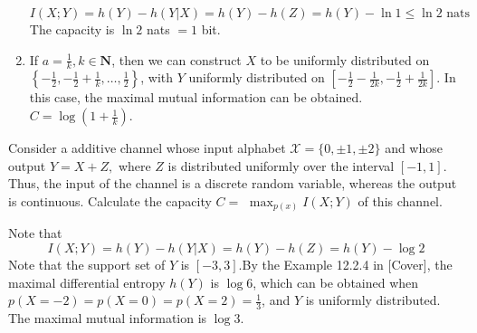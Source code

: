 \begin{exercise}
\begin{solution}
\begin{enumerate}
    \begin{equation}
      I(X;Y) = h(Y) - h(Y|X) = h(Y) - h(Z) = h(Y) - \ln 1 \le \ln 2 \text{ nats}
    \end{equation}
    The capacity is $\ln 2$ nats $= 1$ bit.
    \item If $a = \frac{1}{k}, k\in \mathbf{N}$, then we can construct $X$ to be uniformly distributed on $\left\{-\frac{1}{2}, -\frac{1}{2} + \frac{1}{k}, \ldots,\frac{1}{2} \right\}$, with $Y$ uniformly distributed on $\left[-\frac{1}{2}-\frac{1}{2k}, -\frac{1}{2}+\frac{1}{2k} \right]$. In this case, the maximal mutual information can be obtained. $C = \log \left(1+ \frac{1}{k}\right)$.
  \end{enumerate}
  \end{solution}
  \label{ex8-3}
\end{exercise}


\begin{exercise}{ Consider a additive channel whose input alphabet $\mathcal{X}=\{0,\pm 1,\pm 2\}$ and whose output $Y=X+Z,$ where $Z$ is distributed uniformly over the interval $[-1,1] .$ Thus, the input of the channel is a discrete random variable, whereas the output is continuous. Calculate the capacity $C=$ $\max _{p(x)} I(X ; Y)$ of this channel.}
  \begin{solution}
  Note that
  \begin{equation}
    I(X;Y) = h(Y) - h(Y|X) = h(Y) -h(Z) = h(Y) - \log 2
  \end{equation}
  Note that the support set of $Y$ is $\left[-3,3\right]$.By the Example 12.2.4 in [Cover], the maximal differential entropy $h(Y)$ is $\log 6$, which can be obtained when $p(X=-2) = p(X=0) = p(X=2) = \frac{1}{3}$, and $Y$ is uniformly distributed. The maximal mutual information is $\log 3$.
  \end{solution}
  \label{ex8-4}
\end{exercise}





